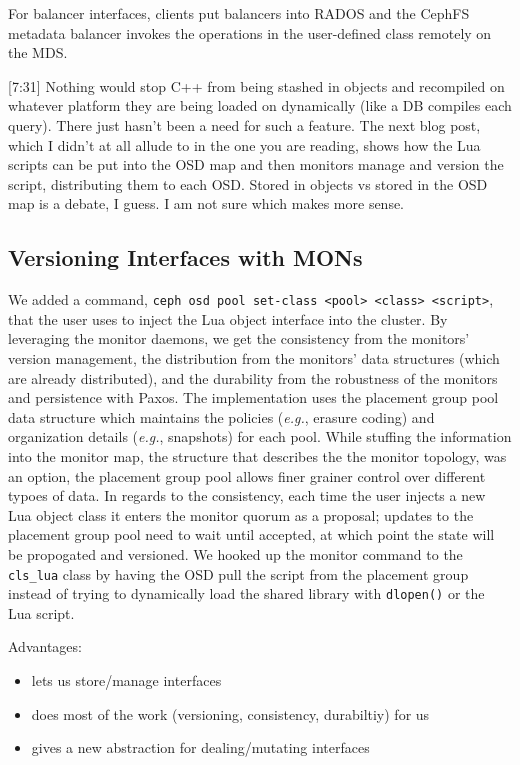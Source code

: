 \documentclass[10pt,twocolumn]{article}
\begin{document}
For balancer interfaces, clients put balancers into RADOS and the CephFS
metadata balancer invokes the operations in the user-defined class
remotely on the MDS.

{[}7:31{]} Nothing would stop C++ from being stashed in objects and
recompiled on whatever platform they are being loaded on dynamically
(like a DB compiles each query). There just hasn't been a need for such
a feature. The next blog post, which I didn't at all allude to in the
one you are reading, shows how the Lua scripts can be put into the OSD
map and then monitors manage and version the script, distributing them
to each OSD. Stored in objects vs stored in the OSD map is a debate, I
guess. I am not sure which makes more sense.

\subsection{Versioning Interfaces with
MONs}\label{versioning-interfaces-with-mons}

We added a command,
\texttt{ceph\ osd\ pool\ set-class\ \textless{}pool\textgreater{}\ \textless{}class\textgreater{}\ \textless{}script\textgreater{}},
that the user uses to inject the Lua object interface into the cluster.
By leveraging the monitor daemons, we get the consistency from the
monitors' version management, the distribution from the monitors' data
structures (which are already distributed), and the durability from the
robustness of the monitors and persistence with Paxos. The
implementation uses the placement group pool data structure which
maintains the policies (\emph{e.g.}, erasure coding) and organization
details (\emph{e.g.}, snapshots) for each pool. While stuffing the
information into the monitor map, the structure that describes the the
monitor topology, was an option, the placement group pool allows finer
grainer control over different typoes of data. In regards to the
consistency, each time the user injects a new Lua object class it enters
the monitor quorum as a proposal; updates to the placement group pool
need to wait until accepted, at which point the state will be propogated
and versioned. We hooked up the monitor command to the \texttt{cls\_lua}
class by having the OSD pull the script from the placement group instead
of trying to dynamically load the shared library with \texttt{dlopen()}
or the Lua script.

Advantages:

\begin{itemize}
\itemsep1pt\parskip0pt
\item
  lets us store/manage interfaces
\item
  does most of the work (versioning, consistency, durabiltiy) for us
\item
  gives a new abstraction for dealing/mutating interfaces
\end{itemize}
\end{document}

